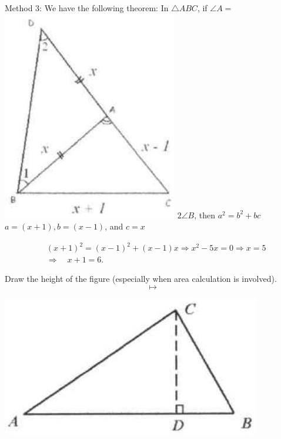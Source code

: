 \documentclass[10pt]{article}
\begin{document}
Method 3: We have the following theorem: In \(\triangle A B C\), if \(\angle A=\)\\
\includegraphics[max width=\textwidth]{2025_04_17_97bc1f7e44d93c271a88g-073} \(2 \angle B\), then \(a^{2}=b^{2}+b c\)\\
\(a=(x+1), b=(x-1)\), and \(c=x\)

\[
\begin{aligned}
& (x+1)^{2}=(x-1)^{2}+(x-1) x \Rightarrow x^{2}-5 x=0 \Rightarrow x=5 \\
& \Rightarrow \quad x+1=6 .
\end{aligned}
\]

Draw the height of the figure (especially when area calculation is involved).
\[
\longmapsto
\]

\begin{center}
\includegraphics[max width=\textwidth]{2025_04_17_97bc1f7e44d93c271a88g-074}
\end{center}
\end{document}
